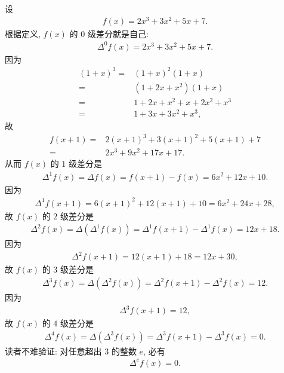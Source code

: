 \begin{example}
    设
    \begin{align*}
        f(x) = 2x^3 + 3x^2 + 5x + 7.
    \end{align*}
    根据定义, $f(x)$ 的 $0$ 级差分就是自己:
    \begin{align*}
        \Delta^0 f(x) = 2x^3 + 3x^2 + 5x + 7.
    \end{align*}
    因为
    \begin{align*}
        (1+x)^3
        = {} & (1+x)^2 (1+x)         \\
        = {} & (1+2x+x^2) (1+x)      \\
        = {} & 1+2x+x^2 + x+2x^2+x^3 \\
        = {} & 1+3x+3x^2+x^3,
    \end{align*}
    故
    \begin{align*}
        f(x+1)
        = {} & 2(x+1)^3 + 3(x+1)^2 + 5(x+1) + 7 \\
        = {} & 2x^3 + 9x^2 + 17x + 17.
    \end{align*}
    从而 $f(x)$ 的 $1$ 级差分是
    \begin{align*}
        \Delta^1 f(x) = \Delta f(x) = f(x+1) - f(x) = 6x^2 + 12x + 10.
    \end{align*}
    因为
    \begin{align*}
        \Delta^1 f(x+1) = 6(x+1)^2 + 12(x+1) + 10 = 6x^2 + 24x + 28,
    \end{align*}
    故 $f(x)$ 的 $2$ 级差分是
    \begin{align*}
        \Delta^2 f(x) = \Delta (\Delta^1 f(x)) = \Delta^1 f(x+1) - \Delta^1 f(x) = 12x + 18.
    \end{align*}
    因为
    \begin{align*}
        \Delta^2 f(x+1) = 12(x+1) + 18 = 12x + 30,
    \end{align*}
    故 $f(x)$ 的 $3$ 级差分是
    \begin{align*}
        \Delta^3 f(x) = \Delta (\Delta^2 f(x)) = \Delta^2 f(x+1) - \Delta^2 f(x) = 12.
    \end{align*}
    因为
    \begin{align*}
        \Delta^3 f(x+1) = 12,
    \end{align*}
    故 $f(x)$ 的 $4$ 级差分是
    \begin{align*}
        \Delta^4 f(x) = \Delta (\Delta^3 f(x)) = \Delta^3 f(x+1) - \Delta^3 f(x) = 0.
    \end{align*}
    读者不难验证: 对任意超出 $3$ 的整数 $e$, 必有
    \begin{align*}
        \Delta^e f(x) = 0.
    \end{align*}


\end{example}
